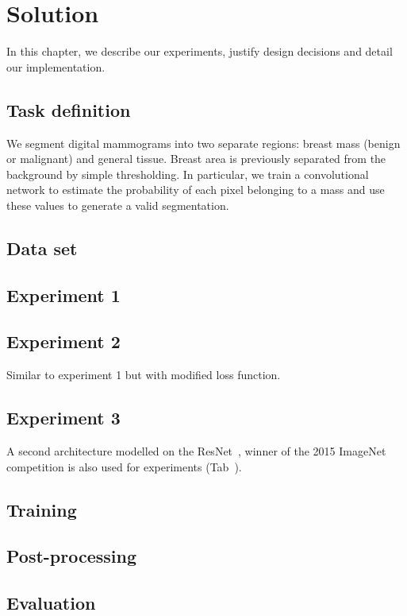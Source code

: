 \chapter{Solution}
\label{ch:Model}

In this chapter, we describe our experiments, justify design decisions and detail our implementation.



\section{Task definition}
We segment digital mammograms into two separate regions: breast mass (benign or malignant) and general tissue.
Breast area is previously separated from the background by simple thresholding.
In particular, we train a convolutional network to estimate the probability of each pixel belonging to a mass and use these values to generate a valid segmentation.

\section{Data set}


\section{Experiment 1}


\section{Experiment 2}
Similar to experiment 1 but with modified loss function.

\section{Experiment 3}
A second architecture modelled on the ResNet~\cite{}, winner of the 2015 ImageNet competition is also used for experiments (Tab~\cite{}).

\section{Training}


\section{Post-processing}


\section{Evaluation}

